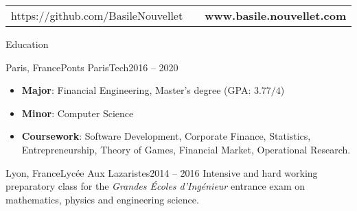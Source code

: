 \documentclass[]{mcdowellcv}
\begin{document}
    \makeheader

    \begin{tabu}
        to 1\textwidth { X[l,p] X[c,p] X[r,p] }
        https://github.com/BasileNouvellet & \textbf{} & \textbf{www.basile.nouvellet.com} \\
    \end{tabu}

    \begin{cvsection}{Education}

        \begin{cvsubsection}{Paris, France}{Ponts ParisTech}{2016 -- 2020}
            \begin{itemize}
                \item \textbf{Major}: Financial Engineering, Master's degree (GPA: \(3.77 / 4\))
                \item \textbf{Minor}: Computer Science
                \item \textbf{Coursework}: Software Development, Corporate Finance, Statistics, Entrepreneurship, Theory of Games, Financial Market, Operational Research.
            \end{itemize}
        \end{cvsubsection}

        \begin{cvsubsection}{Lyon, France}{Lyc\'ee Aux Lazaristes}{2014 -- 2016}
            Intensive and hard working preparatory class for the \textit{Grandes \'Ecoles d'Ing\'enieur} entrance exam on mathematics, physics and engineering science.
        \end{cvsubsection}

    \end{cvsection}
\end{document}
